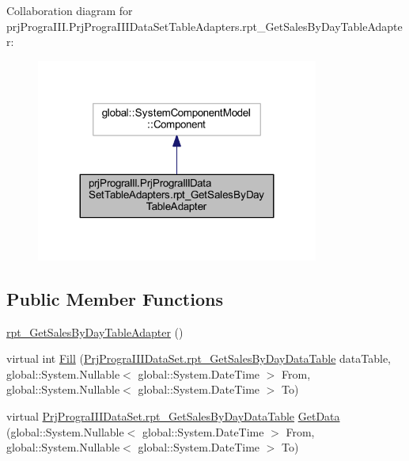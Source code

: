 Collaboration diagram for prj\+Progra\+I\+I\+I.\+Prj\+Progra\+I\+I\+I\+Data\+Set\+Table\+Adapters.\+rpt\+\_\+\+Get\+Sales\+By\+Day\+Table\+Adapter\+:
\nopagebreak
\begin{figure}[H]
\begin{center}
\leavevmode
\includegraphics[width=263pt]{classprj_progra_i_i_i_1_1_prj_progra_i_i_i_data_set_table_adapters_1_1rpt___get_sales_by_day_table_adapter__coll__graph}
\end{center}
\end{figure}
\subsection*{Public Member Functions}
\begin{DoxyCompactItemize}
\item 
\hyperlink{classprj_progra_i_i_i_1_1_prj_progra_i_i_i_data_set_table_adapters_1_1rpt___get_sales_by_day_table_adapter_a1065834c6bfbfddf79a1ed3a5d24ff8c}{rpt\+\_\+\+Get\+Sales\+By\+Day\+Table\+Adapter} ()
\item 
virtual int \hyperlink{classprj_progra_i_i_i_1_1_prj_progra_i_i_i_data_set_table_adapters_1_1rpt___get_sales_by_day_table_adapter_a6df847794448ca89947ab4a30edfe891}{Fill} (\hyperlink{classprj_progra_i_i_i_1_1_prj_progra_i_i_i_data_set_1_1rpt___get_sales_by_day_data_table}{Prj\+Progra\+I\+I\+I\+Data\+Set.\+rpt\+\_\+\+Get\+Sales\+By\+Day\+Data\+Table} data\+Table, global\+::\+System.\+Nullable$<$ global\+::\+System.\+Date\+Time $>$ From, global\+::\+System.\+Nullable$<$ global\+::\+System.\+Date\+Time $>$ To)
\item 
virtual \hyperlink{classprj_progra_i_i_i_1_1_prj_progra_i_i_i_data_set_1_1rpt___get_sales_by_day_data_table}{Prj\+Progra\+I\+I\+I\+Data\+Set.\+rpt\+\_\+\+Get\+Sales\+By\+Day\+Data\+Table} \hyperlink{classprj_progra_i_i_i_1_1_prj_progra_i_i_i_data_set_table_adapters_1_1rpt___get_sales_by_day_table_adapter_a9176f2231efa36d9c98d61c351fce2cb}{Get\+Data} (global\+::\+System.\+Nullable$<$ global\+::\+System.\+Date\+Time $>$ From, global\+::\+System.\+Nullable$<$ global\+::\+System.\+Date\+Time $>$ To)
\end{DoxyCompactItemize}
